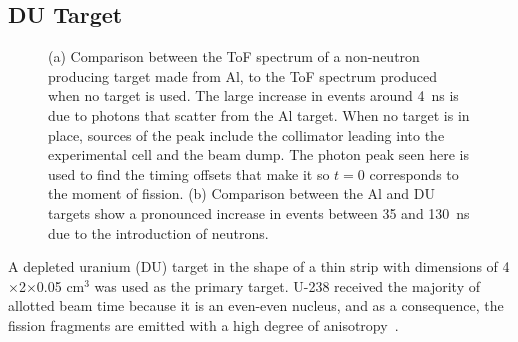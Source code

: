 \subsection{DU Target}
\label{subsection:targets}
\begin{figure}[]
\centering
    \caption{(a) Comparison between the ToF spectrum of a non-neutron producing target made from Al, to the ToF spectrum produced when no target is used.
    The large increase in events around 4~ns is due to photons that scatter from the Al target.
    When no target is in place, sources of the peak include the collimator leading into the experimental cell and the beam dump.
    The photon peak seen here is used to find the timing offsets that make it so $t=0$ corresponds to the moment of fission.
    (b) Comparison between the Al and DU targets show a pronounced increase in events between 35 and 130~ns due to the introduction of neutrons.}
    \label{fig:ToF}
\end{figure}
A depleted uranium (DU) target in the shape of a thin strip with dimensions of 4$\times$2$\times$0.05 $\text{cm}^3$ was used as the primary target.
U-238 received the majority of allotted beam time because it is an even-even nucleus, and as a consequence, the fission fragments are emitted with a high degree of anisotropy~\cite{1977FragAss}.

